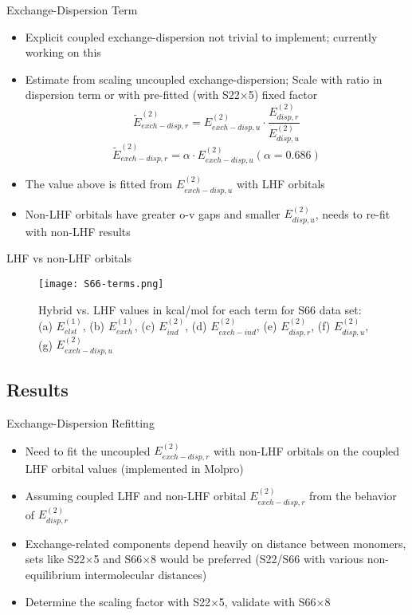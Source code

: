 \documentclass{beamer}
\begin{document}
        \begin{frame}{Exchange-Dispersion Term}
            \begin{itemize}
                \item Explicit coupled exchange-dispersion not trivial to implement; currently working on this
                \item Estimate from scaling uncoupled exchange-dispersion; Scale with ratio in dispersion term or with pre-fitted (with S22$\times$5) fixed factor 
                $$\tilde{E}^{(2)}_{exch-disp,r} = E^{(2)}_{exch-disp,u} \cdot \frac{E^{(2)}_{disp,r}}{E^{(2)}_{disp,u}}$$
                $$\tilde{E}^{(2)}_{exch-disp,r} = \alpha \cdot E^{(2)}_{exch-disp,u} (\alpha = 0.686)$$
                \item The value above is fitted from $E_{exch-disp,u}^{(2)}$ with LHF orbitals
                \item Non-LHF orbitals have greater o-v gaps and smaller $E_{disp,u}^{(2)}$, needs to re-fit with non-LHF results
            \end{itemize}
        \end{frame}

        \begin{frame}{LHF vs non-LHF orbitals}
            \begin{figure}
            \centering
            \texttt{[image: S66-terms.png]}
            \caption{Hybrid vs. LHF values in kcal/mol for each term for S66 data set: (a) $E_{elst}^{(1)}$, (b) $E_{exch}^{(1)}$, (c) $E_{ind}^{(2)}$, (d) $E_{exch-ind}^{(2)}$, (e) $E_{disp,r}^{(2)}$, (f) $E_{disp,u}^{(2)}$, (g) $E_{exch-disp,u}^{(2)}$} 
            \end{figure}        
        \end{frame}

    \subsection{Results}
    
        \begin{frame}{Exchange-Dispersion Refitting}
            \begin{itemize}
                \item Need to fit the uncoupled $E_{exch-disp,r}^{(2)}$ with non-LHF orbitals on the coupled LHF orbital values (implemented in Molpro)
                \item Assuming coupled LHF and non-LHF orbital $E_{exch-disp,r}^{(2)}$ from the behavior of $E_{disp,r}^{(2)}$
                \item Exchange-related components depend heavily on distance between monomers, sets like S22$\times$5 and S66$\times$8 would be preferred (S22/S66 with various non-equilibrium intermolecular distances)
                \item Determine the scaling factor with S22$\times$5, validate with S66$\times$8 
            \end{itemize}
        \end{frame}
\end{document}
